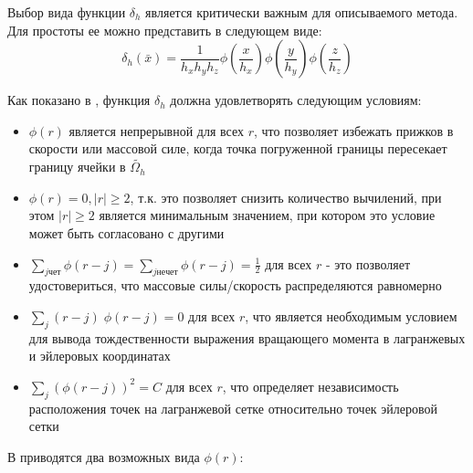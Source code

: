 Выбор вида функции $\delta_h$ является критически важным для описываемого метода. Для простоты ее можно представить в следующем виде:
\begin{equation}
    \delta_h (\bar{x}) = \frac{1}{h_x h_y h_z}
    \phi \left( \frac{x}{h_x} \right)
    \phi \left( \frac{y}{h_y} \right)
    \phi \left( \frac{z}{h_z} \right)
\end{equation}

Как показано в \cite{peskin2002immersed}, функция $\delta_h$ должна удовлетворять следующим условиям:
\begin{itemize}
    \item $\phi(r)$ является непрерывной для всех $r$, что позволяет избежать прижков в скорости или массовой силе,
        когда точка погруженной границы пересекает границу ячейки в $\tilde{\Omega_h}$
    \item $\phi(r) = 0, |r| \geq 2$, т.к. это позволяет снизить количество вычилений, при этом $|r| \geq 2$
        является минимальным значением, при котором это условие может быть согласовано с другими
    \item $\sum_{j чет} \phi(r - j) = \sum_{j нечет} \phi(r - j) = \frac{1}{2}$ для всех $r$ - это позволяет
        удостовериться, что массовые силы/скорость распределяются равномерно
    \item $\sum_{j} (r - j)\; \phi(r - j) = 0$ для всех $r$, что является необходимым условием для вывода тождественности
        выражения вращающего момента в лагранжевых и эйлеровых координатах
    \item $\sum_{j} (\phi(r - j))^2 = C$ для всех $r$, что определяет независимость расположения точек на лагранжевой сетке
        относительно точек эйлеровой сетки
\end{itemize}
В \cite{peskin2002immersed} приводятся два возможных вида $\phi(r)$:





